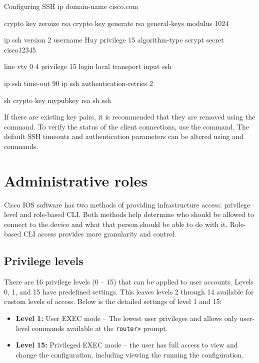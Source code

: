 \begin{sexylisting}{Configuring SSH}
ip domain-name cisco.com

crypto key zeroize rsa
crypto key generate rsa general-keys modulus 1024

ip ssh version 2
username Huy privilege 15 algorithm-type scrypt secret cisco12345

line vty 0 4
	privilege 15
  login local
  transport input ssh

ip ssh time-out 90
ip ssh authentication-retries 2

sh crypto key mypubkey rsa
sh ssh
\end{sexylisting}

If there are existing key pairs, it is recommended that they are removed using the  command. To verify the status of the client connections, use the  command. The default SSH timeouts and authentication parameters can be altered using  and  commands.

\section{Administrative roles}

Cisco IOS software has two methods of providing infrastructure access: privilege level and role-based CLI. Both methods help determine who should be allowed to connect to the device and what that person should be able to do with it. Role-based CLI access provides more granularity and control.

\subsection{Privilege levels}

There are 16 privilege levels (0 -- 15) that can be applied to user accounts. Levels 0, 1, and 15 have predefined settings. This leaves levels 2 through 14 available for custom levels of access. Below is the detailed settings of level 1 and 15:

\begin{itemize}
\item \textbf{Level 1:} User EXEC mode -- The lowest user privileges and allows only user-level commands available at the \verb|router>| prompt.
\item \textbf{Level 15:} Privileged EXEC mode -- the user has full access to view and change the configuration, including viewing the running the configuration.
\end{itemize}

